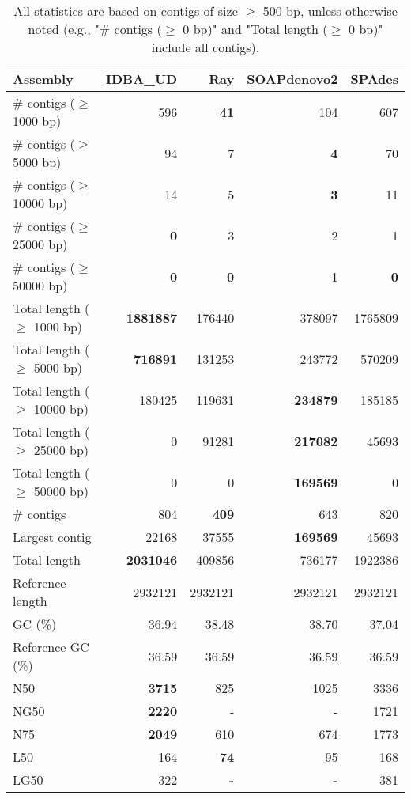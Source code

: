 \documentclass[12pt,a4paper]{article}
\begin{document}
\begin{table}[ht]
\begin{center}
\caption{All statistics are based on contigs of size $\geq$ 500 bp, unless otherwise noted (e.g., "\# contigs ($\geq$ 0 bp)" and "Total length ($\geq$ 0 bp)" include all contigs).}
\begin{tabular}{|l*{4}{|r}|}
\hline
Assembly & IDBA\_UD & Ray & SOAPdenovo2 & SPAdes \\ \hline
\# contigs ($\geq$ 1000 bp) & 596 & {\bf 41} & 104 & 607 \\ \hline
\# contigs ($\geq$ 5000 bp) & 94 & 7 & {\bf 4} & 70 \\ \hline
\# contigs ($\geq$ 10000 bp) & 14 & 5 & {\bf 3} & 11 \\ \hline
\# contigs ($\geq$ 25000 bp) & {\bf 0} & 3 & 2 & 1 \\ \hline
\# contigs ($\geq$ 50000 bp) & {\bf 0} & {\bf 0} & 1 & {\bf 0} \\ \hline
Total length ($\geq$ 1000 bp) & {\bf 1881887} & 176440 & 378097 & 1765809 \\ \hline
Total length ($\geq$ 5000 bp) & {\bf 716891} & 131253 & 243772 & 570209 \\ \hline
Total length ($\geq$ 10000 bp) & 180425 & 119631 & {\bf 234879} & 185185 \\ \hline
Total length ($\geq$ 25000 bp) & 0 & 91281 & {\bf 217082} & 45693 \\ \hline
Total length ($\geq$ 50000 bp) & 0 & 0 & {\bf 169569} & 0 \\ \hline
\# contigs & 804 & {\bf 409} & 643 & 820 \\ \hline
Largest contig & 22168 & 37555 & {\bf 169569} & 45693 \\ \hline
Total length & {\bf 2031046} & 409856 & 736177 & 1922386 \\ \hline
Reference length & 2932121 & 2932121 & 2932121 & 2932121 \\ \hline
GC (\%) & 36.94 & 38.48 & 38.70 & 37.04 \\ \hline
Reference GC (\%) & 36.59 & 36.59 & 36.59 & 36.59 \\ \hline
N50 & {\bf 3715} & 825 & 1025 & 3336 \\ \hline
NG50 & {\bf 2220} & - & - & 1721 \\ \hline
N75 & {\bf 2049} & 610 & 674 & 1773 \\ \hline
L50 & 164 & {\bf 74} & 95 & 168 \\ \hline
LG50 & 322 & {\bf -} & {\bf -} & 381 \\ \hline

\end{tabular}
\end{center}
\end{table}
\end{document}
